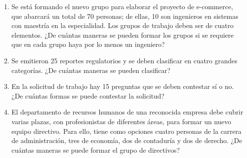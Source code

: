 \begin{Ejer}
\begin{enumerate}
\item Se est\'a formando el nuevo grupo para elaborar el proyecto de e-commerce, que abarcar\'a un total de 70 personas; de ellas, 10 son ingenieros en sistemas con maestr\'ia en la especialidad. Los grupos de trabajo deben ser de cuatro elementos. ¿De cu\'antas maneras se pueden formar los grupos si se requiere que en cada grupo haya por lo menos un ingeniero?

\item Se emitieron 25 reportes regulatorios y se deben clasificar en cuatro grandes categor\'ias. ¿De cu\'antas maneras se pueden clasificar?

\item En la solicitud de trabajo hay 15 preguntas que se deben contestar s\'i o no. ¿De cu\'antas formas se puede contestar la solicitud?

\item El departamento de recursos humanos de una reconocida empresa debe cubrir varias plazas, con profesionistas de diferentes \'areas, para formar un nuevo equipo directivo. Para ello, tiene como opciones cuatro personas de la carrera de administraci\'on, tres de econom\'ia, dos de contadur\'ia y dos de derecho. ¿De cu\'antas maneras se puede formar el grupo de directivos?

\end{enumerate}
\end{Ejer}

